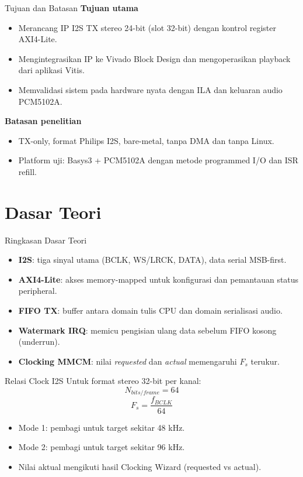 \documentclass[aspectratio=169]{beamer}
\begin{document}
\begin{frame}{Tujuan dan Batasan}
  \textbf{Tujuan utama}
  \begin{itemize}
    \item Merancang IP I2S TX stereo 24-bit (slot 32-bit) dengan kontrol register AXI4-Lite.
    \item Mengintegrasikan IP ke Vivado Block Design dan mengoperasikan playback dari aplikasi Vitis.
    \item Memvalidasi sistem pada hardware nyata dengan ILA dan keluaran audio PCM5102A.
  \end{itemize}

  \vspace{0.5em}
  \textbf{Batasan penelitian}
  \begin{itemize}
    \item TX-only, format Philips I2S, bare-metal, tanpa DMA dan tanpa Linux.
    \item Platform uji: Basys3 + PCM5102A dengan metode programmed I/O dan ISR refill.
  \end{itemize}
\end{frame}

\section{Dasar Teori}

\begin{frame}{Ringkasan Dasar Teori}
  \begin{itemize}
    \item \textbf{I2S}: tiga sinyal utama (BCLK, WS/LRCK, DATA), data serial MSB-first.
    \item \textbf{AXI4-Lite}: akses memory-mapped untuk konfigurasi dan pemantauan status peripheral.
    \item \textbf{FIFO TX}: buffer antara domain tulis CPU dan domain serialisasi audio.
    \item \textbf{Watermark IRQ}: memicu pengisian ulang data sebelum FIFO kosong (underrun).
    \item \textbf{Clocking MMCM}: nilai \textit{requested} dan \textit{actual} memengaruhi $F_s$ terukur.
  \end{itemize}
\end{frame}

\begin{frame}{Relasi Clock I2S}
  Untuk format stereo 32-bit per kanal:
  \[
    N_{bits/frame} = 64
  \]
  \[
    F_s = \frac{f_{BCLK}}{64}
  \]

  \vspace{0.5em}
  \begin{itemize}
    \item Mode 1: pembagi untuk target sekitar 48 kHz.
    \item Mode 2: pembagi untuk target sekitar 96 kHz.
    \item Nilai aktual mengikuti hasil Clocking Wizard (requested vs actual).
  \end{itemize}
\end{frame}
\end{document}
